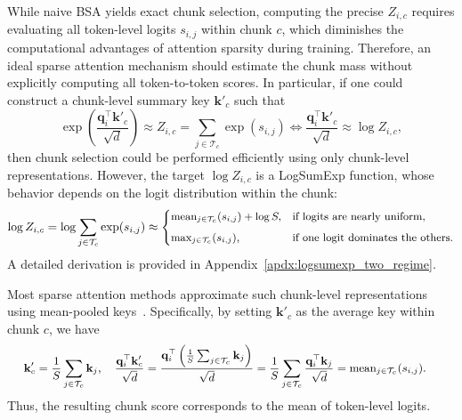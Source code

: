While naive BSA yields exact chunk selection, computing the precise $Z_{i,c}$ requires evaluating all token-level logits $s_{i,j}$ within chunk $c$, which diminishes the computational advantages of attention sparsity during training.
Therefore, an ideal sparse attention mechanism should estimate the chunk mass without explicitly computing all token-to-token scores. In particular, if one could construct a chunk-level summary key $\mathbf{k}'_c$ such that
\begin{equation}
\exp\left(\frac{\mathbf{q}_i^\top \mathbf{k}'_c}{\sqrt{d}}\right)
\approx
Z_{i,c}
=
\sum_{j\in \mathcal{T}_c}\exp(s_{i,j})
\Longleftrightarrow
\frac{\mathbf{q}_i^\top \mathbf{k}'_c}{\sqrt{d}}
\approx
\log Z_{i,c},
\end{equation}
then chunk selection could be performed efficiently using only chunk-level representations. However, the target $\log Z_{i,c}$ is a LogSumExp function, whose behavior depends on the logit distribution within the chunk:
\begin{equation}
\small
\label{eq:two_regime}
\log Z_{i,c}
=
\log \sum_{j\in\mathcal{T}_c}\exp(s_{i,j})
\approx
\begin{cases}
\operatorname{mean}_{j\in\mathcal{T}_c}(s_{i,j})+\log S,
& \text{if logits are nearly uniform}, \\[2mm]
\max_{j\in\mathcal{T}_c}(s_{i,j}),
& \text{if one logit dominates the others}.
\end{cases}
\end{equation}
A detailed derivation is provided in Appendix~\ref{apdx:logsumexp_two_regime}.

Most sparse attention methods approximate such chunk-level representations using mean-pooled keys~\cite{yuan-etal-2025-native,DBLP:journals/corr/abs-2502-13189}. Specifically, by setting $\mathbf{k}'_c$ as the average key within chunk $c$, we have
\begin{equation}
\small
\begin{aligned}
&\mathbf{k}'_c=\frac{1}{S}\sum_{j\in\mathcal{T}_c}\mathbf{k}_j,\quad \frac{\mathbf{q}_i^\top\mathbf{k}'_c}{\sqrt{d}}
=
\frac{\mathbf{q}_i^\top\left(\frac{1}{S}\sum_{j\in\mathcal{T}_c}\mathbf{k}_j\right)}{\sqrt{d}}
=
\frac{1}{S}\sum_{j\in\mathcal{T}_c}
\frac{\mathbf{q}_i^\top\mathbf{k}_j}{\sqrt{d}}
=
\operatorname{mean}_{j\in\mathcal{T}_c}(s_{i,j}).
\end{aligned}
\end{equation}
Thus, the resulting chunk score corresponds to the mean of token-level logits.

